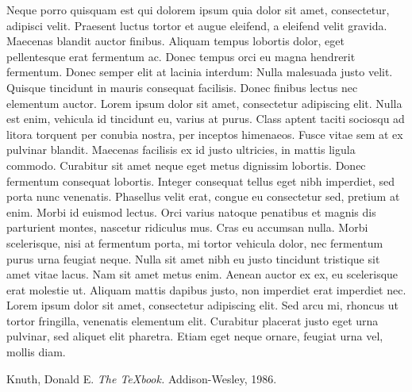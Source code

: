 Neque porro quisquam est qui dolorem ipsum quia dolor sit amet,
consectetur, adipisci velit. Praesent luctus tortor et augue eleifend,
a eleifend velit gravida. Maecenas blandit auctor finibus. Aliquam
tempus lobortis dolor, eget pellentesque erat fermentum ac. Donec
tempus orci eu magna hendrerit fermentum. Donec semper elit at lacinia
interdum:
\quote
Nulla malesuada justo velit. Quisque tincidunt in mauris consequat
facilisis. Donec finibus lectus nec elementum auctor. Lorem ipsum
dolor sit amet, consectetur adipiscing elit. Nulla est enim, vehicula
id tincidunt eu, varius at purus. Class aptent taciti sociosqu ad
litora torquent per conubia nostra, per inceptos himenaeos. Fusce
vitae sem at ex pulvinar blandit. Maecenas facilisis ex id justo
ultricies, in mattis ligula commodo. Curabitur sit amet neque eget
metus dignissim lobortis. Donec fermentum consequat lobortis. Integer
consequat tellus eget nibh imperdiet, sed porta nunc venenatis.
\endquote
Phasellus velit erat, congue eu consectetur sed, pretium at
enim. Morbi id euismod lectus. Orci varius natoque penatibus et magnis
dis parturient montes, nascetur ridiculus mus. Cras eu accumsan
nulla. Morbi scelerisque, nisi at fermentum porta, mi tortor vehicula
dolor, nec fermentum purus urna feugiat neque. Nulla sit amet nibh eu
justo tincidunt tristique sit amet vitae lacus. Nam sit amet metus
enim. Aenean auctor ex ex, eu scelerisque erat molestie ut. Aliquam
mattis dapibus justo, non imperdiet erat imperdiet nec. Lorem ipsum
dolor sit amet, consectetur adipiscing elit. Sed arcu mi, rhoncus ut
tortor fringilla, venenatis elementum elit. Curabitur placerat justo
eget urna pulvinar, sed aliquet elit pharetra. Etiam eget neque
ornare, feugiat urna vel, mollis diam.

Knuth, Donald E. {\it The \TeX book.} Addison-Wesley, 1986. 
\endcite
\endmla
\bye

